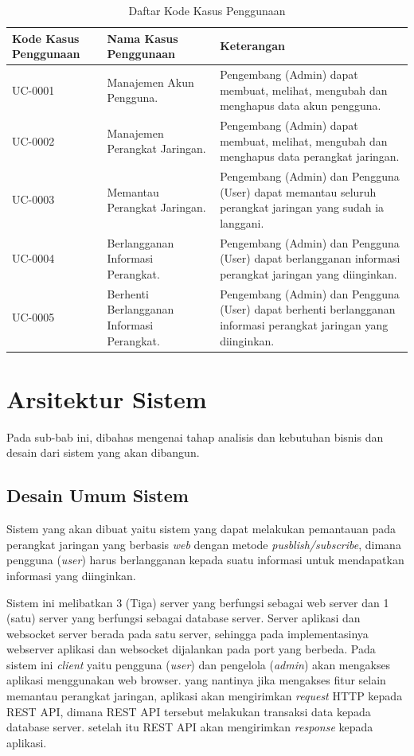         \begin{longtable}{|p{}|p{}|p{}|} %
		    	
		    	\caption{Daftar Kode Kasus Penggunaan} \label{tabelKodeKasusPenggunaan} \\
		    	\hline
		    	\textbf{Kode Kasus Penggunaan} & \textbf{Nama Kasus Penggunaan} & \textbf{Keterangan} \\ \hline
		    	\endhead
		    	\endfoot
		    	\endlastfoot
		    	UC-0001 & Manajemen Akun Pengguna. & Pengembang (Admin) dapat membuat, melihat, mengubah dan menghapus data akun pengguna. \\ \hline
		    	UC-0002 & Manajemen Perangkat Jaringan.  & Pengembang (Admin) dapat membuat, melihat, mengubah dan menghapus data perangkat jaringan.\\ \hline
		    	UC-0003 & Memantau Perangkat Jaringan. & Pengembang (Admin) dan Pengguna (User) dapat memantau seluruh perangkat jaringan yang sudah ia langgani. \\ \hline
		    	UC-0004 & Berlangganan Informasi Perangkat. & Pengembang (Admin) dan Pengguna (User) dapat berlangganan informasi perangkat jaringan yang diinginkan. \\ \hline
		    	UC-0005 & Berhenti Berlangganan Informasi Perangkat. & Pengembang (Admin) dan Pengguna (User) dapat berhenti berlangganan informasi perangkat jaringan yang diinginkan. \\ \hline	
		    \end{longtable}

	\section{Arsitektur Sistem}
		Pada sub-bab ini, dibahas mengenai tahap analisis dan kebutuhan bisnis dan desain dari sistem yang akan dibangun.

		\subsection{Desain Umum Sistem}
			Sistem yang akan dibuat yaitu sistem yang dapat melakukan pemantauan pada perangkat jaringan yang berbasis \textit{web} dengan metode \textit{pusblish/subscribe}, dimana pengguna (\textit{user}) harus berlangganan kepada suatu informasi untuk mendapatkan informasi yang diinginkan.
			
			Sistem ini melibatkan 3 (Tiga) server yang berfungsi sebagai web server dan 1 (satu) server yang berfungsi sebagai database server. Server aplikasi dan websocket server berada pada satu server, sehingga pada implementasinya webserver aplikasi dan websocket dijalankan pada port yang berbeda. Pada sistem ini \textit{client} yaitu pengguna (\textit{user}) dan pengelola (\textit{admin}) akan mengakses aplikasi menggunakan web browser. yang nantinya jika mengakses fitur selain memantau perangkat jaringan, aplikasi akan mengirimkan \textit{request} HTTP kepada REST API, dimana REST API tersebut melakukan transaksi data kepada database server. setelah itu REST API akan mengirimkan \textit{response} kepada aplikasi.
			
